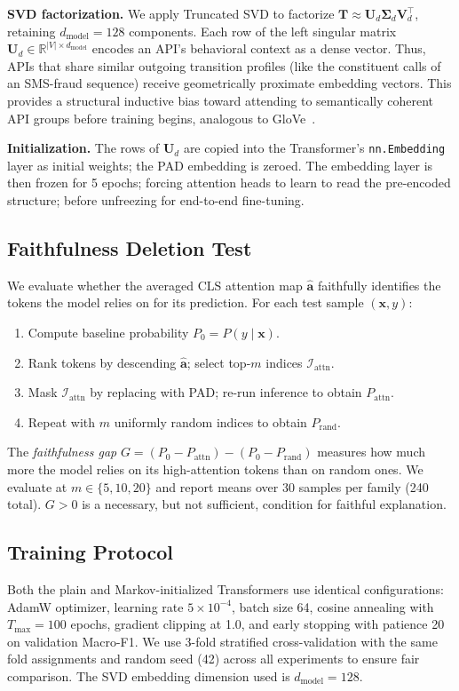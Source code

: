 \documentclass[12pt]{article}
\begin{document}
\textbf{SVD factorization.}
We apply Truncated SVD to factorize $\mathbf{T} \approx \mathbf{U}_d \boldsymbol{\Sigma}_d \mathbf{V}_d^\top$, retaining $d_{\text{model}}=128$ components. Each row of the left singular matrix $\mathbf{U}_d \in \mathbb{R}^{|V| \times d_{\text{model}}}$ encodes an API's behavioral context as a dense vector. Thus, APIs that share similar outgoing transition profiles (like the constituent calls of an SMS-fraud sequence) receive geometrically proximate embedding vectors. This provides a structural inductive bias toward attending to semantically coherent API groups before training begins, analogous to GloVe~\citep{pennington2014glove}.

\textbf{Initialization.}
The rows of $\mathbf{U}_d$ are copied into the Transformer's
\texttt{nn.Embedding} layer as initial weights; the PAD embedding is
zeroed. The embedding layer is then frozen for 5 epochs; forcing
attention heads to learn to read the pre-encoded structure; before
unfreezing for end-to-end fine-tuning.

\subsection{Faithfulness Deletion Test}
\label{sec:deletion}

We evaluate whether the averaged CLS attention map $\hat{\mathbf{a}}$
faithfully identifies the tokens the model relies on for its prediction.
For each test sample $(\mathbf{x}, y)$:
\begin{enumerate}
  \item Compute baseline probability $P_0 = P(y \mid \mathbf{x})$.
  \item Rank tokens by descending $\hat{\mathbf{a}}$; select top-$m$
    indices $\mathcal{I}_{\text{attn}}$.
  \item Mask $\mathcal{I}_{\text{attn}}$ by replacing with PAD;
    re-run inference to obtain $P_{\text{attn}}$.
  \item Repeat with $m$ uniformly random indices to obtain $P_{\text{rand}}$.
\end{enumerate}
The \textit{faithfulness gap}
$G = (P_0 - P_{\text{attn}}) - (P_0 - P_{\text{rand}})$
measures how much more the model relies on its high-attention tokens
than on random ones. We evaluate at $m \in \{5, 10, 20\}$ and report
means over 30 samples per family (240 total). $G > 0$ is a necessary,
but not sufficient, condition for faithful explanation.

\subsection{Training Protocol}
Both the plain and Markov-initialized Transformers use identical
configurations: AdamW optimizer, learning rate $5 \times 10^{-4}$,
batch size 64, cosine annealing with $T_{\max}=100$ epochs, gradient
clipping at 1.0, and early stopping with patience 20 on validation Macro-F1.
We use 3-fold stratified cross-validation with the same fold assignments
and random seed (42) across all experiments to ensure fair comparison.
The SVD embedding dimension used is $d_{\text{model}}=128$.
\end{document}
